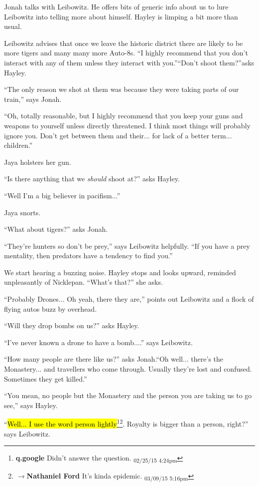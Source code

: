 Jonah talks with Leibowitz.  He offers bits of generic info about us to lure Leibowitz into telling more about himself.  Hayley is limping a bit more than usual.  



Leibowitz advises that once we leave the historic district there are likely to be more tigers and many many more Auto-8s.  ``I highly recommend that you don't interact with any of them unless they interact with you.''``Don't shoot them?''asks Hayley.

``The only reason we shot at them was because they were taking parts of our train,'' says Jonah.

``Oh, totally reasonable, but I highly recommend that you keep your guns and weapons to yourself unless directly threatened.  I think most things will probably ignore you.  Don't get between them and their... for lack of a better term... children.''  

Jaya holsters her gun.

``Is there anything that we \textit{should} shoot at?'' asks Hayley.

``Well I'm a big believer in pacifism...''

Jaya snorts.

``What about tigers?'' asks Jonah.

``They're hunters so don't be prey,'' says Leibowitz helpfully.  ``If you have a prey mentality, then predators have a tendency to find you.''



We start hearing a buzzing noise.  Hayley stops and looks upward, reminded unpleasantly of Nicklepan.  ``What's that?'' she asks.

``Probably Drones... Oh yeah, there they are,'' points out Leibowitz and a flock of flying autos buzz by overhead.

``Will they drop bombs on us?'' asks Hayley.

``I've never known a drone to have a bomb....'' says Leibowitz.



``How many people are there like us?'' asks Jonah.``Oh well... there's the Monastery... and travellers who come through.  Usually they're lost and confused.  Sometimes they get killed.''

``You mean, no people but the Monastery and the person you are taking us to go see,'' says Hayley.

``\hl{Well... I use the word person lightly}\footnote{\textbf{q.google }Didn't answer the question. \textsubscript{02/25/15 4:24pm}}\footnote{$\rightarrow$\textbf{Nathaniel Ford }It's kinda epidemic. \textsubscript{03/09/15 5:16pm}}.  Royalty is bigger than a person, right?'' says Leibowitz.



